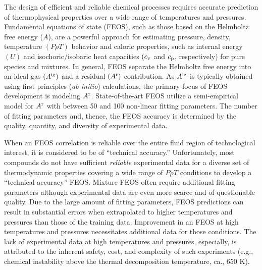 \documentclass[11pt,a4paper]{article}
\begin{document}
The design of efficient and reliable chemical processes requires accurate prediction of thermophysical properties over a wide range of temperatures and pressures. Fundamental equations of state (FEOS), such as those based on the Helmholtz free energy ($A$), are a powerful approach for estimating pressure, density, temperature $(P\rho T)$ behavior and caloric properties, such as internal energy $(U)$ and isochoric/isobaric heat capacities $(c_{\rm v}$ and $c_{\rm p}$, respectively) for pure species and mixtures. In general, FEOS separate the Helmholtz free energy into an ideal gas $(A^{\rm ig})$ and a residual $(A^{\rm r})$ contribution. As $A^{\rm ig}$ is typically obtained using first principles (\textit{ab initio}) calculations, the primary focus of FEOS development is modeling $A^{\rm r}$. State-of-the-art FEOS utilize a semi-empirical model for $A^{\rm r}$ with between 50 and 100 non-linear fitting parameters. The number of fitting parameters and, thence, the FEOS accuracy is determined by the quality, quantity, and diversity of experimental data. 

When an FEOS correlation is reliable over the entire fluid region of technological interest, it is considered to be of ``technical accuracy.'' Unfortunately, most compounds do not have sufficient \textit{reliable} experimental data for a diverse set of thermodynamic properties covering a wide range of $P \rho T$ conditions to develop a ``technical accuracy'' FEOS. Mixture FEOS often require additional fitting parameters although experimental data are even more scarce and of questionable quality. Due to the large amount of fitting parameters, FEOS predictions can result in substantial errors when extrapolated to higher temperatures and pressures than those of the training data. Improvement in an FEOS at high temperatures and pressures necessitates additional data for those conditions. The lack of experimental data at high temperatures and pressures, especially, is attributed to the inherent safety, cost, and complexity of such experiments (e.g., chemical instability above the thermal decomposition temperature, ca., 650 K).
\end{document}
